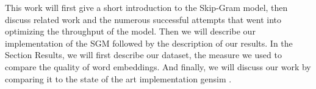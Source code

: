 This work will first give a short introduction to the Skip-Gram model, then discuss related work and the numerous successful attempts that went into optimizing the throughput of the model. Then we will describe our implementation of the SGM followed by the description of our results. In the Section Results, we will first describe our dataset, the measure we used to compare the quality of word embeddings. And finally, we will discuss our work by comparing it to the state of the art implementation gensim \cite{gensim}. 















